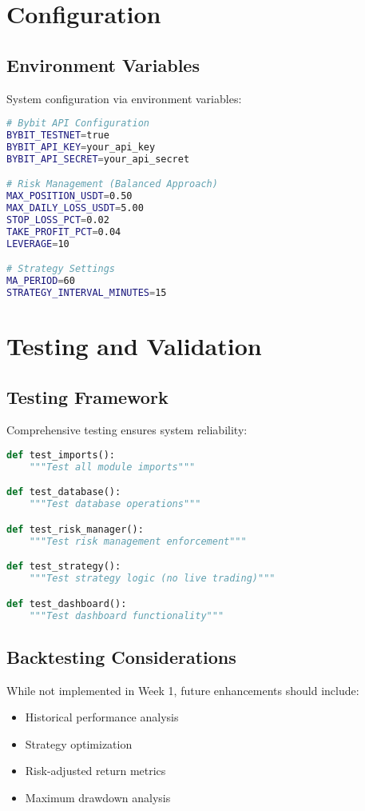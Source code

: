 \documentclass[12pt,a4paper]{article}
\begin{document}
\section{Configuration}

\subsection{Environment Variables}
System configuration via environment variables:

\begin{lstlisting}[language=bash, caption=Environment Configuration]
# Bybit API Configuration
BYBIT_TESTNET=true
BYBIT_API_KEY=your_api_key
BYBIT_API_SECRET=your_api_secret

# Risk Management (Balanced Approach)
MAX_POSITION_USDT=0.50
MAX_DAILY_LOSS_USDT=5.00
STOP_LOSS_PCT=0.02
TAKE_PROFIT_PCT=0.04
LEVERAGE=10

# Strategy Settings
MA_PERIOD=60
STRATEGY_INTERVAL_MINUTES=15
\end{lstlisting}

\section{Testing and Validation}

\subsection{Testing Framework}
Comprehensive testing ensures system reliability:

\begin{lstlisting}[language=Python, caption=Test Coverage]
def test_imports():
    """Test all module imports"""

def test_database():
    """Test database operations"""

def test_risk_manager():
    """Test risk management enforcement"""

def test_strategy():
    """Test strategy logic (no live trading)"""

def test_dashboard():
    """Test dashboard functionality"""
\end{lstlisting}

\subsection{Backtesting Considerations}
While not implemented in Week 1, future enhancements should include:

\begin{itemize}
\item Historical performance analysis
\item Strategy optimization
\item Risk-adjusted return metrics
\item Maximum drawdown analysis
\end{itemize}
\end{document}
